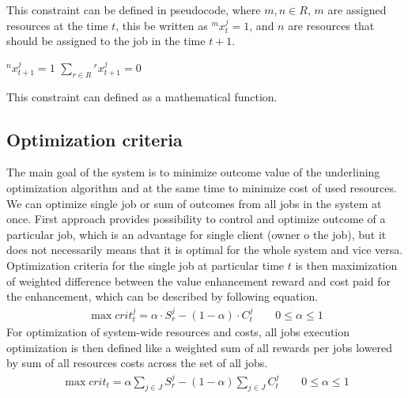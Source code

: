 This constraint can be defined in pseudocode,
where $m, n \in R$, $m$ are assigned resources at the time $t$,
this be written as  ${}^{m}x_{t}^{j} = 1$,
and $n$ are resources that should be assigned to the job in the time $t+1$.

\medskip

\begin{samepage}
	\begin{algorithmic}
		\STATE ${}^{n}x_{t+1}^{j} = 1$
		\ELSE
		\STATE $\sum_{r \in R} {}^{r}x_{t+1}^{j} = 0$
		\ENDIF 
		\ENDIF 
	\end{algorithmic}        
\end{samepage}

\medskip

This constraint can defined as a mathematical function.

\subsection{Optimization criteria}\label{subsec:optimization-criteria}
The main goal of the system is to minimize outcome value of the underlining optimization algorithm
and at the same time to minimize cost of used resources.
We can optimize single job or sum of outcomes from all jobs in the system at once.
First approach provides possibility to control and optimize outcome of a particular job,
which is an advantage for single client (owner o the job),
but it does not necessarily means that it is optimal for the whole system and vice versa.
Optimization criteria for the single job at particular time $t$ is then
maximization of weighted difference between the value enhancement reward 
and cost paid for the enhancement,
which can be described by following equation.
\begin{align*}
	\max crit_{t}^{j} = \alpha \cdot S_{r}^{j} - (1 - \alpha) \cdot C_{t}^{j} \qquad 0 \leq \alpha \leq 1 
\end{align*}
For optimization of system-wide resources and costs,
all jobs execution optimization is then defined like a
weighted sum of all rewards per jobs lowered by sum of all resources costs across the set of all jobs.
\begin{align*}
	\max crit_{t} = \alpha \sum_{j \in J} S_{r}^{j} - (1 - \alpha) \sum_{j \in J} C_{t}^{j} \qquad 0 \leq \alpha \leq 1 
\end{align*}
